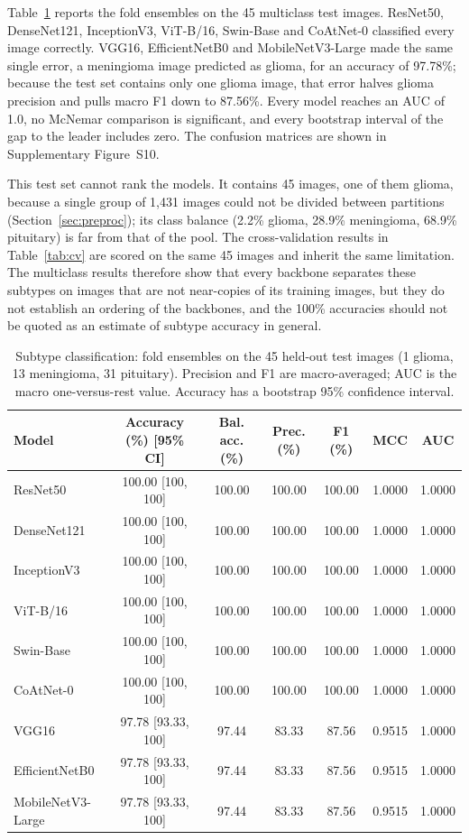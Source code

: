 \documentclass[final,3p,times,number]{elsarticle}
\begin{document}
Table~\ref{tab:multiclass-results} reports the fold ensembles on the 45 multiclass test images. ResNet50, DenseNet121, InceptionV3, ViT-B/16, Swin-Base and CoAtNet-0 classified every image correctly. VGG16, EfficientNetB0 and MobileNetV3-Large made the same single error, a meningioma image predicted as glioma, for an accuracy of 97.78\%; because the test set contains only one glioma image, that error halves glioma precision and pulls macro F1 down to 87.56\%. Every model reaches an AUC of 1.0, no McNemar comparison is significant, and every bootstrap interval of the gap to the leader includes zero. The confusion matrices are shown in Supplementary Figure~S10.

This test set cannot rank the models. It contains 45 images, one of them glioma, because a single group of 1,431 images could not be divided between partitions (Section~\ref{sec:preproc}); its class balance (2.2\% glioma, 28.9\% meningioma, 68.9\% pituitary) is far from that of the pool. The cross-validation results in Table~\ref{tab:cv} are scored on the same 45 images and inherit the same limitation. The multiclass results therefore show that every backbone separates these subtypes on images that are not near-copies of its training images, but they do not establish an ordering of the backbones, and the 100\% accuracies should not be quoted as an estimate of subtype accuracy in general.

\begin{table}[htbp]
\centering
\caption{Subtype classification: fold ensembles on the 45 held-out test images (1 glioma, 13 meningioma, 31 pituitary). Precision and F1 are macro-averaged; AUC is the macro one-versus-rest value. Accuracy has a bootstrap 95\% confidence interval.}
\label{tab:multiclass-results}
\small
\begin{tabular*}{\textwidth}{@{\extracolsep{\fill}}lcccccc@{}}
\toprule
Model & Accuracy (\%) [95\% CI] & Bal. acc. (\%) & Prec. (\%) & F1 (\%) & MCC & AUC \\
\midrule
ResNet50 & 100.00 [100, 100] & 100.00 & 100.00 & 100.00 & 1.0000 & 1.0000 \\
DenseNet121 & 100.00 [100, 100] & 100.00 & 100.00 & 100.00 & 1.0000 & 1.0000 \\
InceptionV3 & 100.00 [100, 100] & 100.00 & 100.00 & 100.00 & 1.0000 & 1.0000 \\
ViT-B/16 & 100.00 [100, 100] & 100.00 & 100.00 & 100.00 & 1.0000 & 1.0000 \\
Swin-Base & 100.00 [100, 100] & 100.00 & 100.00 & 100.00 & 1.0000 & 1.0000 \\
CoAtNet-0 & 100.00 [100, 100] & 100.00 & 100.00 & 100.00 & 1.0000 & 1.0000 \\
VGG16 & 97.78 [93.33, 100] & 97.44 & 83.33 & 87.56 & 0.9515 & 1.0000 \\
EfficientNetB0 & 97.78 [93.33, 100] & 97.44 & 83.33 & 87.56 & 0.9515 & 1.0000 \\
MobileNetV3-Large & 97.78 [93.33, 100] & 97.44 & 83.33 & 87.56 & 0.9515 & 1.0000 \\
\bottomrule
\end{tabular*}
\end{table}
\end{document}
